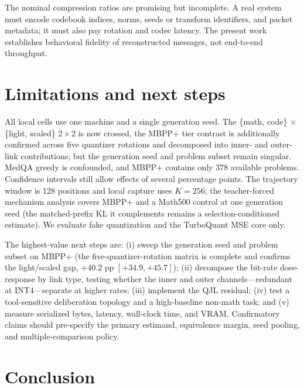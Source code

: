 \documentclass{article}
\begin{document}
The nominal compression ratios are promising but incomplete. A real system must
encode codebook indices, norms, seeds or transform identifiers, and packet metadata;
it must also pay rotation and codec latency. The present work establishes behavioral
fidelity of reconstructed messages, not end-to-end throughput.

\section{Limitations and next steps}

All local cells use one machine and a single generation seed. The \{math, code\} $\times$
\{light, scaled\} $2\times2$ is now crossed, the MBPP+ tier contrast is additionally
confirmed across five quantizer rotations and decomposed into inner- and outer-link
contributions; but the generation seed and problem subset remain singular. MedQA greedy is confounded, and MBPP+ contains only 378 available
problems. Confidence intervals still
allow effects of several percentage points. The trajectory window is
128 positions and local capture uses $K=256$; the teacher-forced mechanism analysis covers MBPP+
and a Math500 control at one generation seed (the matched-prefix KL it complements remains a
selection-conditioned estimate). We evaluate fake quantization and the TurboQuant MSE core only.

The highest-value next steps are: (i) sweep the generation seed and problem subset on
MBPP+ (the five-quantizer-rotation matrix is complete and confirms the light/scaled gap,
$+40.2$ pp $[+34.9,+45.7]$); (ii) decompose the bit-rate dose-response by link type, testing
whether the inner and outer channels---redundant at INT4---separate at higher rates; (iii) implement the QJL
residual; (iv) test a tool-sensitive deliberation topology and a high-baseline non-math task;
and (v) measure serialized bytes, latency, wall-clock time, and VRAM. Confirmatory claims should
pre-specify the primary estimand, equivalence margin, seed pooling, and multiple-comparison policy.

\section{Conclusion}
\end{document}
